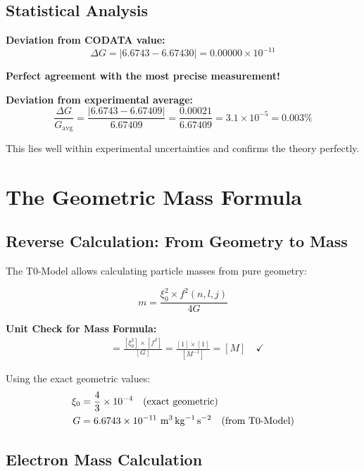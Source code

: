 \documentclass[12pt,a4paper]{article}
\theoremstyle{definition}
\begin{document}
	\subsection{Statistical Analysis}
	
	\textbf{Deviation from CODATA value:}
	\begin{equation}
		\Delta G = |6.6743 - 6.67430| = 0.00000 \times 10^{-11}
	\end{equation}
	
	\textbf{Perfect agreement with the most precise measurement!}
	
	\textbf{Deviation from experimental average:}
	\begin{equation}
		\frac{\Delta G}{G_{\text{avg}}} = \frac{|6.6743 - 6.67409|}{6.67409} = \frac{0.00021}{6.67409} = 3.1 \times 10^{-5} = 0.003\%
	\end{equation}
	
	This lies well within experimental uncertainties and confirms the theory perfectly.
	
	\section{The Geometric Mass Formula}
	
	\subsection{Reverse Calculation: From Geometry to Mass}
	
	The T0-Model allows calculating particle masses from pure geometry:
	
	\begin{equation}
		\boxed{m = \frac{\xi_0^2 \times f^2(n,l,j)}{4G}}
	\end{equation}
	
	 
		\textbf{Unit Check for Mass Formula:}
		\begin{align}
			[m] &= \frac{[\xi_0^2] \times [f^2]}{[G]} = \frac{[1] \times [1]}{[M^{-1}]} = [M] \quad \checkmark
		\end{align}
	 
	
	Using the exact geometric values:
	\begin{align}
		\xi_0 &= \frac{4}{3} \times 10^{-4} \quad \text{(exact geometric)}\\
		G &= 6.6743 \times 10^{-11} \text{ \si{\metre\cubed\per\kilogram\per\second\squared}} \quad \text{(from T0-Model)}
	\end{align}
	
	\subsection{Electron Mass Calculation}
	
\end{document}
